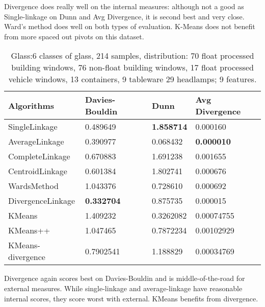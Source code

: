 Divergence does really well on the internal measures: although not a good as Single-linkage on Dunn and Avg Divergence, it is second best and very close.  Ward's method does well on both types of evaluation. K-Means does not benefit from more spaced out pivots on this dataset.

\begin{table}
\caption{Glass:6 classes of glass, 214 samples, distribution: 
	   70 float processed building windows,
       76 non-float building windows,
       17 float processed vehicle windows,
       13 containers,
       9 tableware
       29 headlamps;
9 features.}\label{tab:Glass}
\begin{tabularx}{\textwidth}{l@{\hskip 1in}XXl}
\hline
Algorithms			&Davies-Bouldin  	&Dunn			&Avg Divergence\\ 
\hline 
SingleLinkage			&0.489649        		&\textbf{1.858714}	&0.000160\\       
AverageLinkage			&0.390977        		&0.068432			&\textbf{0.000010}\\       
CompleteLinkage		&0.670883  		&1.691238			&0.001655\\  
CentroidLinkage		&0.601384        		&1.802741			&0.000676\\       
WardsMethod			&1.043376  		&0.728610 		&0.000692\\       
DivergenceLinkage		&\textbf{0.332704}	&0.875735			&0.000015\\       
KMeans				&1.409232			&0.3262082		&0.00074755\\
KMeans++				&1.047465			&0.7872234		&0.00102929\\
KMeans-divergence		&0.7902541		&1.188829			&0.00034769\\
\hline
\end{tabularx}
\end{table}

Divergence again scores best on Davies-Bouldin and is middle-of-the-road for external measures.  While single-linkage and average-linkage have reasonable internal scores, they score worst with external.  KMeans benefits from divergence.

